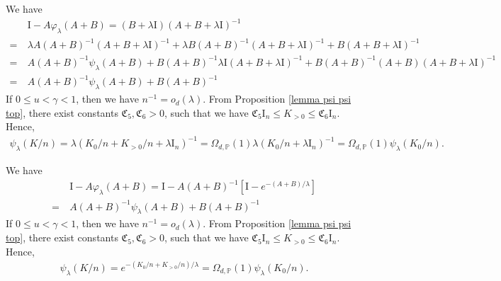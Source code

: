 \documentclass{article}
\theoremstyle{plain}
\theoremstyle{definition}
\theoremstyle{remark}
\newcommand{\reg}{\varphi_\lambda}
\newcommand{\rem}{\psi_\lambda}
\begin{document}
\begin{appendix}
We have
\begin{equation*}
    \begin{aligned}
        &~\mathrm{I}-A\reg(A+B) =
        (B+\lambda \mathrm{I})(A+B+\lambda \mathrm{I})^{-1}\\
        =&~
        \lambda A(A+B)^{-1}(A+B+\lambda \mathrm{I})^{-1} + \lambda B(A+B)^{-1}(A+B+\lambda \mathrm{I})^{-1} + B(A+B+\lambda \mathrm{I})^{-1}\\
        =&~
        A(A+B)^{-1}\rem(A+B) + B(A+B)^{-1}\lambda \mathrm{I}(A+B+\lambda \mathrm{I})^{-1}+
        B(A+B)^{-1}(A+B)(A+B+\lambda \mathrm{I})^{-1}\\
        =&~A(A+B)^{-1}\rem(A+B) + B(A+B)^{-1}
    \end{aligned}
\end{equation*}
If $0 \leq u < \gamma <1$, then we have $n^{-1}=o_d(\lambda)$. From Proposition \ref{lemma psi psi top}, there exist constants $\mathfrak{C}_5, \mathfrak{C}_6 >0$, such that we have $\mathfrak{C}_5 \mathrm{I}_n \leq K_{>0} \leq \mathfrak{C}_6 \mathrm{I}_n$. Hence,
\begin{equation*}
    \begin{aligned}
        \rem(K/n) = \lambda (K_{0}/n + K_{> 0}/n + \lambda \mathrm{I}_n)^{-1} 
        =\Omega_{d, \mathbb{P}}(1)\lambda (K_{0}/n  + \lambda \mathrm{I}_n)^{-1}
        = \Omega_{d, \mathbb{P}}(1)\rem(K_{0}/n).
    \end{aligned}
\end{equation*}

We have
\begin{equation*}
    \begin{aligned}
        &~\mathrm{I}-A\reg(A+B) =
        \mathrm{I} - A(A+B)^{-1}\left[\mathrm{I} - e^{-(A+B)/\lambda}\right]\\
        =&~A(A+B)^{-1}\rem(A+B) + B(A+B)^{-1}
    \end{aligned}
\end{equation*}
If $0 \leq u < \gamma <1$, then we have $n^{-1}=o_d(\lambda)$. From Proposition \ref{lemma psi psi top}, there exist constants $\mathfrak{C}_5, \mathfrak{C}_6 >0$, such that we have $\mathfrak{C}_5 \mathrm{I}_n \leq K_{>0} \leq \mathfrak{C}_6 \mathrm{I}_n$. Hence,
\begin{equation*}
    \begin{aligned}
        \rem(K/n) = e^{- (K_{0}/n + K_{> 0}/n)/\lambda} 
        = \Omega_{d, \mathbb{P}}(1)\rem(K_{0}/n).
    \end{aligned}
\end{equation*}




\end{appendix}
\end{document}
